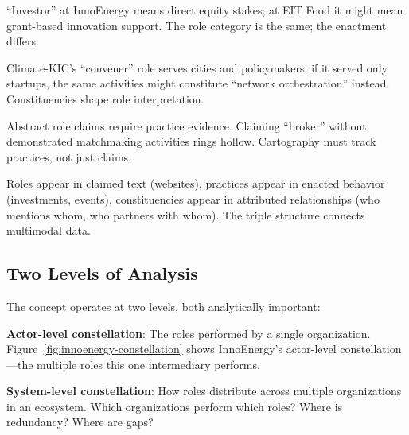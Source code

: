 \documentclass[../main.tex]{subfiles}
\begin{document}
\begin{description}[leftmargin=0.5cm, itemsep=0.2em]
\item[Same role, different practices.] ``Investor'' at InnoEnergy means direct equity stakes; at EIT Food it might mean grant-based innovation support. The role category is the same; the enactment differs.

\item[Constituencies define role meaning.] Climate-KIC's ``convener'' role serves cities and policymakers; if it served only startups, the same activities might constitute ``network orchestration'' instead. Constituencies shape role interpretation.

\item[Practices signal role credibility.] Abstract role claims require practice evidence. Claiming ``broker'' without demonstrated matchmaking activities rings hollow. Cartography must track practices, not just claims.

\item[Triples link modalities.] Roles appear in claimed text (websites), practices appear in enacted behavior (investments, events), constituencies appear in attributed relationships (who mentions whom, who partners with whom). The triple structure connects multimodal data.
\end{description}


\subsection{Two Levels of Analysis}

The concept operates at two levels, both analytically important:

\textbf{Actor-level constellation}: The roles performed by a single organization. Figure~\ref{fig:innoenergy-constellation} shows InnoEnergy's actor-level constellation---the multiple roles this one intermediary performs.

\textbf{System-level constellation}: How roles distribute across multiple organizations in an ecosystem. Which organizations perform which roles? Where is redundancy? Where are gaps?
\end{document}
